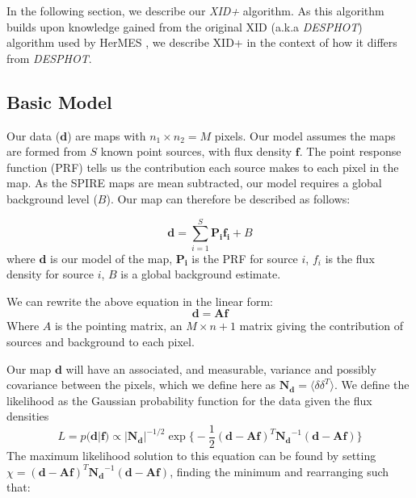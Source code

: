\documentclass[useAMS,usenatbib]{mnras}
\begin{document}
In the following section, we describe our \emph{XID+} algorithm. As this algorithm builds upon knowledge gained from the original XID (a.k.a \emph{DESPHOT}) algorithm used by HerMES \citep{Roseboom:2010, Roseboom:2011, Wang:2014}, we describe XID+ in the context of how it differs from \emph{DESPHOT}. 


\subsection{Basic Model}
Our data ($\mathbf{d}$) are maps with $n_1 \times n_2 = M$ pixels. Our model assumes the maps are formed from $S$ known point sources, with flux density $\mathbf{f}$. The point response function (PRF) tells us the contribution each source makes to each pixel in the map. As the SPIRE maps are mean subtracted, our model requires a global background level ($B$). Our map can therefore be described as follows:

\begin{equation}
\mathbf{d} = \sum\limits_{i=1}^S \mathbf{P_i f_i} + B 
\label{eq:map}
\end{equation}
where $\mathbf{d}$ is our model of the map, $\mathbf{P_i}$ is the PRF for source $i$, $f_i$ is the flux density for source $i$, $B$ is a global background estimate.

We can rewrite the above equation in the linear form:
\begin{equation}
\mathbf{d} = \mathbf{Af}
\label{eq:map2}
\end{equation}
Where $A$ is the pointing matrix, an $M \times n+1$ matrix giving the contribution of sources and background to each pixel.

Our map $\mathbf{d}$ will have an associated, and measurable, variance and possibly covariance between the pixels, which we define here as $\mathbf{N_d} = \langle\delta\delta^T\rangle$. We define the likelihood as the Gaussian probability function for the data given the flux densities
\begin{equation}
L = p(\mathbf{d}|\mathbf{f}) \propto |\mathbf{N_d}|^{-1/2} \exp\big\{ -\frac{1}{2}(\mathbf{d}-\mathbf{Af})^T\mathbf{N_d}^{-1}(\mathbf{d}-\mathbf{Af})\big\}\label{eq:likelihood}
\end{equation}
The maximum likelihood solution to this equation can be found by setting $\chi = (\mathbf{d}-\mathbf{Af})^T\mathbf{N_d}^{-1}(\mathbf{d}-\mathbf{Af})$, finding the minimum and rearranging such that:
\end{document}
